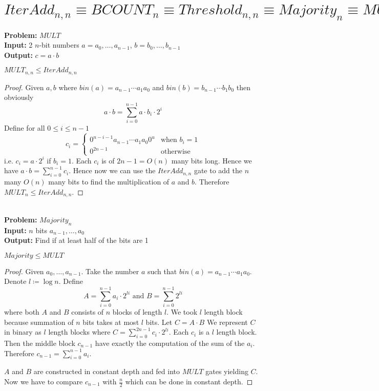 \section{$IterAdd_{n,n}\equiv BCOUNT_n\equiv Threshold_{n,n} \equiv Majority_n\equiv MULT_{n}$}
\textbf{Problem:} $MULT$\\
\textbf{Input:} 2 $n$-bit numbers $a=a_0,\dots,a_{n-1}$, $b=b_0,\dots,b_{n-1}$\\
\textbf{Output:} $c=a\cdot b$\\
\begin{theorem}\label{multaddrel}
	$MULT_{n,n}\leq IterAdd_{n,n}$
\end{theorem}
\begin{proof}
	Given $a,b$ where $bin(a)=a_{n-1}\cdots a_1a_0$ and $bin(b)=b_{n-1}\cdots b_1b_0$ then obviously $$a\cdot b=\sum_{i=0}^{n-1}a\cdot b_i\cdot 2^i$$Define for all $0\leq i\leq n-1$ $$c_i=\begin{cases}
		0^{n-i-1}a_{n-1}\cdots a_1a_0 0^u & \text{when $b_i=1$}\\
		0^{2n-1} & \text{otherwise}
	\end{cases}$$i.e. $c_i=a\cdot 2^i$ if $b_i=1$. Each $c_i$ is of $2n-1=O(n) $ many bits long. Hence we have $a\cdot b=\sum_{i=0}^{n-1} c_i$. Hence now we can use the $IterAdd_{n,n}$ gate to add the $n$ many $O(n)$ many bits to find the multiplication of $a$ and $b$. Therefore $MULT_n\leq IterAdd_{n,n}$.
\end{proof}\\
\textbf{Problem:} $Majority_n$\\
\textbf{Input:} $n$ bits $a_{n-1},\dots, a_0$\\
\textbf{Output:} Find if at least half of the bits are 1\\
\begin{theorem}\label{majmultrel}
	$Majority\leq MULT$
\end{theorem}
\begin{proof}
	Given $a_0,\dots,a_{n-1}$. Take the number $a$ such that $bin(a)=a_{n-1}\cdots a_1a_0$. Denote $l\coloneqq \log n$. Define $$A=\sum_{i=0}^{n-1}a_i\cdot 2^{li}\text{ and }B=\sum_{i=0}^{n-1}2^{li}$$where both $A$ and $B$ consists of $n$ blocks of length $l$. We took $l$ length block because summation of $n$ bits takes at most $l$ bits. Let $C=A\cdot B$ We represent $C$ in binary as $l$ length blocks where  $C=\sum_{i=0}^{2n-1}c_i\cdot 2^{li}$. Each $c_i$ is a $l$ length block. Then the middle block $c_{n-1}$ have exactly the computation of the sum of the $a_i$. Therefore $c_{n-1}=\sum_{i=0}^{n-1}a_i$.
	
	$A$ and $B$ are constructed in constant depth and fed into $MULT$ gates yielding $C$. Now we have to compare $c_{n-1}$ with $\frac{n}{2}$ which can be done in constant depth.
\end{proof}\\
